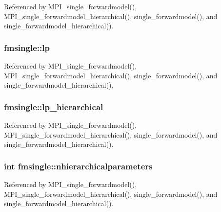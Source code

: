 Referenced by M\+P\+I\+\_\+single\+\_\+forwardmodel(), M\+P\+I\+\_\+single\+\_\+forwardmodel\+\_\+hierarchical(), single\+\_\+forwardmodel(), and single\+\_\+forwardmodel\+\_\+hierarchical().

\subsubsection[{\texorpdfstring{lp}{lp}}]{ fmsingle\+::lp}\hypertarget{structfmsingle_a8461a52c9112de045c4276da3eca60ec}{}\label{structfmsingle_a8461a52c9112de045c4276da3eca60ec}


Referenced by M\+P\+I\+\_\+single\+\_\+forwardmodel(), M\+P\+I\+\_\+single\+\_\+forwardmodel\+\_\+hierarchical(), single\+\_\+forwardmodel(), and single\+\_\+forwardmodel\+\_\+hierarchical().

\subsubsection[{\texorpdfstring{lp\+\_\+hierarchical}{lp_hierarchical}}]{ fmsingle\+::lp\+\_\+hierarchical}\hypertarget{structfmsingle_ae4b5351778dc439e3e8a23e5ab63f26f}{}\label{structfmsingle_ae4b5351778dc439e3e8a23e5ab63f26f}


Referenced by M\+P\+I\+\_\+single\+\_\+forwardmodel(), M\+P\+I\+\_\+single\+\_\+forwardmodel\+\_\+hierarchical(), single\+\_\+forwardmodel(), and single\+\_\+forwardmodel\+\_\+hierarchical().

\subsubsection[{\texorpdfstring{nhierarchicalparameters}{nhierarchicalparameters}}]{\setlength{\rightskip}{0pt plus 5cm}int fmsingle\+::nhierarchicalparameters}\hypertarget{structfmsingle_a5de749dceaf19fb0388f6c9749aa5e44}{}\label{structfmsingle_a5de749dceaf19fb0388f6c9749aa5e44}


Referenced by M\+P\+I\+\_\+single\+\_\+forwardmodel(), M\+P\+I\+\_\+single\+\_\+forwardmodel\+\_\+hierarchical(), single\+\_\+forwardmodel(), and single\+\_\+forwardmodel\+\_\+hierarchical().

